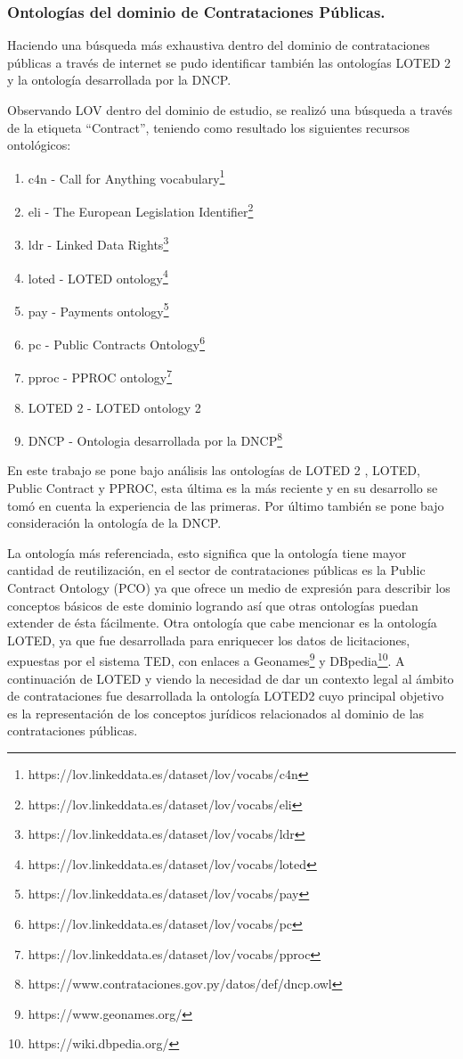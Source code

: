 \subsubsection{Ontologías del dominio de Contrataciones Públicas.}
Haciendo una búsqueda más exhaustiva dentro del dominio de contrataciones públicas a través de internet se pudo identificar también las ontologías LOTED 2 y la ontología desarrollada por la DNCP.

Observando LOV dentro del dominio de estudio, se realizó una búsqueda a través de la etiqueta “Contract”, teniendo como resultado los siguientes recursos ontológicos:

\begin{enumerate}
    \item c4n - Call for Anything vocabulary\footnote{https://lov.linkeddata.es/dataset/lov/vocabs/c4n}
    \item eli - The European Legislation Identifier\footnote{https://lov.linkeddata.es/dataset/lov/vocabs/eli}
    \item ldr - Linked Data Rights\footnote{https://lov.linkeddata.es/dataset/lov/vocabs/ldr}
    \item loted - LOTED ontology\footnote{https://lov.linkeddata.es/dataset/lov/vocabs/loted}
    \item pay - Payments ontology\footnote{https://lov.linkeddata.es/dataset/lov/vocabs/pay}
    \item  pc - Public Contracts Ontology\footnote{https://lov.linkeddata.es/dataset/lov/vocabs/pc}
    \item pproc - PPROC ontology\footnote{https://lov.linkeddata.es/dataset/lov/vocabs/pproc} 
    \item LOTED 2 - LOTED ontology 2 \cite{distinto2014loted2}
    \item DNCP - Ontologia desarrollada por la DNCP\footnote{https://www.contrataciones.gov.py/datos/def/dncp.owl}
\end{enumerate}

En este trabajo se pone bajo análisis las ontologías de LOTED 2 , LOTED, Public Contract y PPROC, esta última es la más reciente y en su desarrollo se tomó en cuenta la experiencia de las primeras. Por último también se pone bajo consideración la ontología de la DNCP.

La ontología más referenciada, esto significa que la ontología tiene mayor cantidad de reutilización, en el sector de contrataciones públicas es la Public Contract Ontology (PCO)\cite{klimek2012lod2}  ya que ofrece un medio de expresión para describir los conceptos básicos de este dominio logrando así que otras ontologías puedan extender de ésta fácilmente. Otra ontología que cabe mencionar es la ontología LOTED, ya que fue desarrollada para enriquecer los datos de licitaciones, expuestas por el sistema TED, con enlaces a Geonames\footnote{https://www.geonames.org/} y DBpedia\footnote{https://wiki.dbpedia.org/}. A continuación de LOTED y viendo la necesidad de dar un contexto legal al ámbito de contrataciones fue desarrollada la ontología LOTED2\cite{distinto2014loted2} cuyo principal objetivo es la representación de los conceptos jurídicos relacionados al dominio de las contrataciones públicas.

